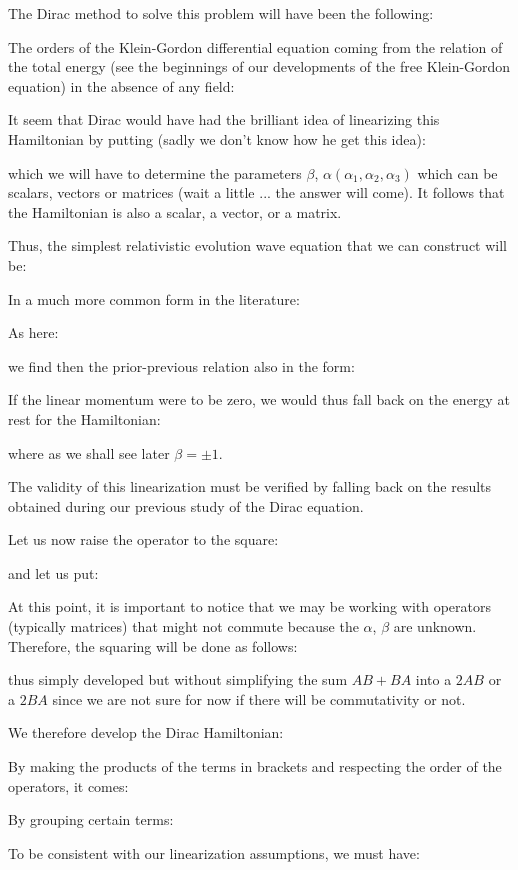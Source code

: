 	The Dirac method to solve this problem will have been the following:

	The orders of the Klein-Gordon differential equation coming from the relation  of the total energy (see the beginnings of our developments of the free Klein-Gordon equation) in the absence of any field:
	
	It seem that Dirac would have had the brilliant idea of linearizing this Hamiltonian by putting (sadly we don't know how he get this idea):
	
	which we will have to determine the parameters $\beta$, $\alpha(\alpha_1,\alpha_2,\alpha_3)$ which can be scalars, vectors or matrices (wait a little ... the answer will come). It follows that the Hamiltonian is also a scalar, a vector, or a matrix.

	Thus, the simplest relativistic evolution wave equation that we can construct will be:
	
	In a much more common form in the literature:
	
	As here:
	
	we find then the prior-previous relation also in the form:
	
	If the linear momentum were to be zero, we would thus fall back on the energy at rest for the Hamiltonian:
	
	where as we shall see later $\beta=\pm 1$.
	
	The validity of this linearization must be verified by falling back on the results obtained during our previous study of the Dirac equation.

	Let us now raise the operator to the square:
	
	and let us put:
	
	At this point, it is important to notice that we may be working with operators (typically matrices) that might not commute because the $\alpha$, $\beta$ are unknown. Therefore, the squaring will be done as follows:
	
	thus simply developed but without simplifying the sum $AB + BA$ into a $2AB$ or a $2BA$ since we are not sure for now if there will be commutativity or not.

	We therefore develop the Dirac Hamiltonian:
	
	By making the products of the terms in brackets and respecting the order of the operators, it comes:
	
	By grouping certain terms:
	
	To be consistent with our linearization assumptions, we must have:
	
